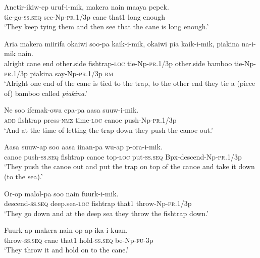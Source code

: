 \ea
\gll  Anetir-ikiw-ep  uruf-i-mik,  makera  nain  maaya  pepek. \\
tie-go-\textsc{ss.seq}  see-Np-\textsc{pr}.1/3p  cane  that1  long  enough \\
\glt ‘They keep tying them and then see that the cane is long enough.’ \\
\z


\ea
\gll  Aria  makera  miirifa  okaiwi  soo-pa  kaik-i-mik,       okaiwi  pia  kaik-i-mik,  piakina  na-i-mik  nain. \\
alright  cane  end  other.side  fishtrap-\textsc{loc}  tie-Np-\textsc{pr}.1/3p   other.side  bamboo  tie{}-Np-\textsc{pr}.1/3p  piakina  say-Np-\textsc{pr}.1/3p  \textsc{rm} \\


\glt ‘Alright one end of the cane is tied to the trap, to the other end they tie a (piece of) bamboo called \textit{piakina}.’ \\
\z


\ea
\gll  Ne  soo  ifemak-owa  epa-pa  aasa  suuw-i-mik. \\
\textsc{add}  fishtrap  press-\textsc{nmz}  time-\textsc{loc}  canoe  push{}-Np-\textsc{pr}.1/3p \\
\glt ‘And at the time of letting the trap down they push the canoe out.’ \\
\z


\ea
\gll  Aasa  suuw-ap  soo  aasa  iinan-pa  wu-ap           p-ora-i-mik. \\
canoe  push-\textsc{ss.seq}  fishtrap  canoe  top-\textsc{loc}  put-\textsc{ss.seq}  Bpx-descend-Np-\textsc{pr}.1/3p \\


\glt ‘They push the canoe out and put the trap on top of the canoe and take it down (to the sea).’ \\
\z


\ea
\gll  Or-op  malol-pa  soo  nain  fuurk-i-mik. \\
descend-\textsc{ss.seq}  deep.sea-\textsc{loc}  fishtrap  that1  throw{}-Np-\textsc{pr}.1/3p \\
\glt ‘They go down and at the deep sea they throw the fishtrap down.’ \\
\z


\ea
\gll  Fuurk-ap  makera  nain  op-ap  ika-i-kuan. \\
throw-\textsc{ss.seq}  cane  that1  hold-\textsc{ss.seq}  be-Np-\textsc{fu}-3p \\
\glt ‘They throw it and hold on to the cane.’ \\
\z


